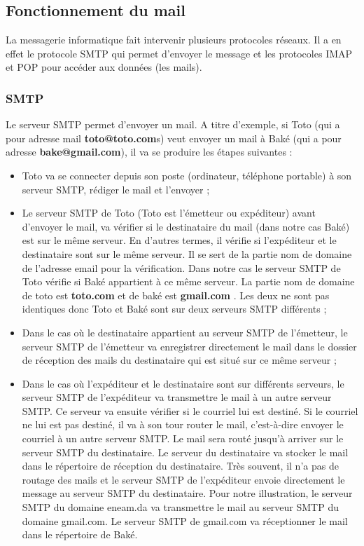 \documentclass[a4paper,12pt,french]{report} %
\begin{document}
\subsection{Fonctionnement du mail}
La messagerie informatique fait intervenir plusieurs protocoles réseaux. Il a en effet le protocole SMTP qui permet d'envoyer le message et les protocoles IMAP et POP pour accéder aux données (les mails).
\subsubsection{SMTP}
Le serveur SMTP permet d'envoyer un mail. A titre d'exemple, si Toto (qui a pour adresse mail \textbf{toto@toto.com}s) veut envoyer un mail à Baké (qui a pour adresse \textbf{bake@gmail.com}), il va se produire les étapes suivantes :
\begin{itemize}
	\item Toto va se connecter depuis son poste (ordinateur, téléphone portable) à son serveur SMTP, rédiger le mail et l'envoyer ;
	\item Le serveur SMTP de Toto (Toto est l'émetteur ou expéditeur) avant  d'envoyer le mail, va vérifier  si le destinataire du mail (dans notre cas Baké) est sur le même serveur. En d'autres termes, il vérifie si l'expéditeur et le destinataire sont sur le même serveur. Il se sert de la partie nom de domaine de l'adresse email pour la vérification. Dans notre cas le serveur SMTP de Toto vérifie si Baké appartient à ce même serveur. La partie nom de domaine de toto est \textbf{toto.com} et de baké est \textbf{gmail.com} . Les deux ne sont pas identiques donc Toto et Baké sont sur deux serveurs SMTP différents ;
	\item Dans le cas où le destinataire appartient au serveur SMTP de l'émetteur, le serveur SMTP de l'émetteur va enregistrer directement le mail dans le dossier de réception des mails du destinataire qui est situé sur ce même serveur ;
	\item Dans le cas où l'expéditeur et le destinataire sont sur différents serveurs, le serveur SMTP de l'expéditeur va transmettre le mail à un autre serveur SMTP. Ce serveur va ensuite vérifier si le courriel lui est destiné. Si le courriel ne lui est pas destiné,  il va à son tour router le mail, c'est-à-dire envoyer le courriel à un autre serveur SMTP. Le mail sera routé jusqu'à arriver sur le serveur SMTP du destinataire. Le serveur du destinataire va stocker le mail dans le répertoire de réception du destinataire. Très souvent, il n'a pas de routage des mails et le serveur SMTP de l'expéditeur envoie directement le message au serveur SMTP du destinataire. Pour notre illustration, le serveur SMTP du domaine eneam.da va transmettre le mail au serveur SMTP du domaine gmail.com. Le serveur SMTP de gmail.com va réceptionner le mail dans le répertoire de Baké.

\end{itemize}
\end{document}
